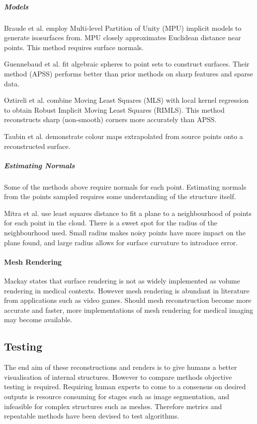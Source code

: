 \documentclass[11p, titlepage]{article}
\begin{document}
\subparagraph{Models}

Braude et al. \cite{braude2007contour} employ Multi-level Partition of Unity (MPU) implicit models to generate isosurfaces from. MPU closely approximates Euclidean distance near points. This method requires surface normals. 

Guennebaud et al. \cite{guennebaud2007algebraic} fit algebraic spheres to point sets to construct surfaces. Their method (APSS) performs better than prior methods on sharp features and sparse data.

Oztireli et al. \cite{oztireli2009feature} combine Moving Least Squares (MLS) with local kernel regression to obtain Robust Implicit Moving Least Squares (RIMLS). This method reconstructs sharp (non-smooth) corners more accurately than APSS.

Taubin et al. \cite{taubin2012smooth} demonstrate colour maps extrapolated from source points onto a reconstructed surface.

\subparagraph{Estimating Normals}

Some of the methods above require normals for each point. Estimating normals from the points sampled requires some understanding of the structure itself.

Mitra et al. \cite{mitra2003estimating} use least squares distance to fit a plane to a neighbourhood of points for each point in the cloud. There is a sweet spot for the radius of the neighbourhood used. Small radius makes noisy points have more impact on the plane found, and large radius allows for surface curvature to introduce error. 

\paragraph{Mesh Rendering}

Mackay \cite{mackay2019robust} states that surface rendering is not as widely implemented as volume rendering in medical contexts. However mesh rendering is abundant in literature from applications such as video games. Should mesh reconstruction become more accurate and faster, more implementations of mesh rendering for medical imaging may become available.

\subsection{Testing}

The end aim of these reconstructions and renders is to give humans a better visualisation of internal structures. However to compare methods objective testing is required. Requiring human experts to come to a consensus on desired outputs is resource consuming for stages such as image segmentation, and infeasible for complex structures such as meshes. Therefore metrics and repeatable methods have been devised to test algorithms.
\end{document}
